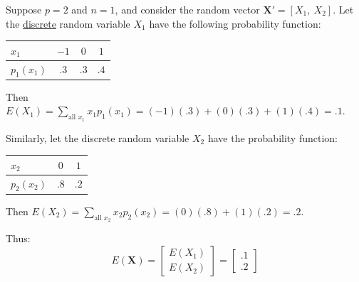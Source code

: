 \documentclass[a4paper]{article}
\begin{document}
    \begin{examplebox}
        Suppose $p=2$ and $n=1$, and consider the random vector $\mathbf{X}' = \left[X_{1}, \: X_{2}\right]$. Let the \underline{discrete} random variable $X_{1}$ have the following probability function:
        \begin{center}
            \begin{tabular}{@{} l | c c c @{}}
                $x_{1}$ & $-1$ & $0$ & $1$ \\
                \midrule
                $p_{1}\left(x_{1}\right)$ & $.3$ & $.3$ & $.4$ \\
            \end{tabular}
        \end{center}
        Then $ E\left(X_{1}\right) = \displaystyle\sum_{\text{all } x_{1}} x_{1}p_{1}\left(x_{1}\right) = \left(-1\right)\left(.3\right) + \left(0\right)\left(.3\right) + \left(1\right)\left(.4\right) = .1$.

        \noindent
        Similarly, let the discrete random variable $X_{2}$ have the probability function:
        \begin{center}
            \begin{tabular}{@{} l | c c @{}}
                $x_{2}$ & $0$ & $1$ \\
                \midrule
                $p_{2}\left(x_{2}\right)$ & $.8$ & $.2$ \\
            \end{tabular}
        \end{center}
        Then $ E\left(X_{2}\right) = \displaystyle\sum_{\text{all } x_{2}} x_{2}p_{2}\left(x_{2}\right) = \left(0\right)\left(.8\right) + \left(1\right)\left(.2\right) = .2$.
        
        \noindent
        Thus:
        \begin{equation*}
            E\left(\mathbf{X}\right) = \begin{bmatrix}
                E\left(X_{1}\right) \\ E\left(X_{2}\right)
            \end{bmatrix}
            =
            \begin{bmatrix}
                .1 \\ .2
            \end{bmatrix}
        \end{equation*}
    \end{examplebox}

    \newpage
\end{document}
